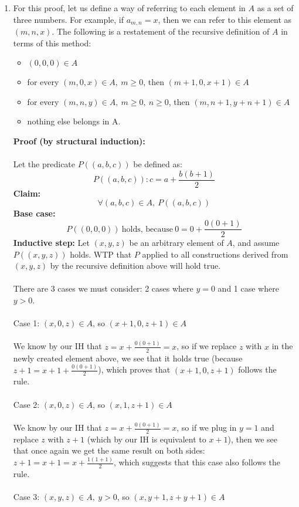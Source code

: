 \documentclass{article}
\begin{document}
\begin{enumerate}
	\item For this proof, let us define a way of referring to each element in $A$ as a set of three numbers. For example, if $a_{m,n}=x$, then we can refer to this element as $(m,n,x)$. The following is a restatement of the recursive definition of $A$ in terms of this method: 
	\begin{itemize}
		\item $(0,0,0) \in A$
		\item for every $(m,0,x) \in A,\ m \geq 0$, then $(m+1,0,x+1) \in A$
		\item for every $(m,n,y) \in A,\ m \geq 0,\ n \geq 0$, then $(m,n+1,y+n+1) \in A$
		\item nothing else belongs in A.
	\end{itemize}
	\textbf{Proof (by structural induction):} \\\\
	Let the predicate $P((a,b,c))$ be defined as: $$P((a,b,c)): c = a+\frac{b(b+1)}{2}$$
	\textbf{Claim:} $$\forall (a,b,c) \in A,\ P((a,b,c))$$
	\textbf{Base case:} $$P((0,0,0))\ \textrm{holds, because}\ 0 = 0 + \frac{0(0+1)}{2}$$
	\textbf{Inductive step:} Let $(x,y,z)$ be an arbitrary element of $A$, and assume $P((x,y,z))$ holds. WTP that $P$ applied to all constructions derived from $(x,y,z)$ by the recursive definition above will hold true. \\\\
	There are 3 cases we must consider: 2 cases where $y=0$ and 1 case where $y>0$. \\\\
	Case 1: $(x,0,z) \in A$, so $(x+1,0,z+1) \in A$ \\\\
	We know by our IH that $z=x+\frac{0(0+1)}{2}=x$, so if we replace $z$ with $x$ in the newly created element above, we see that it holds true (because $z+1=x+1+\frac{0(0+1)}{2}$), which proves that $(x+1,0,z+1)$ follows the rule. \\\\
	Case 2: $(x,0,z) \in A$, so $(x,1,z+1) \in A$ \\\\
	We know by our IH that $z=x+\frac{0(0+1)}{2}=x$, so if we plug in $y=1$ and replace $z$ with $z+1$ (which by our IH is equivalent to $x+1$), then we see that once again we get the same result on both sides: $z+1=x+1=x+\frac{1(1+1)}{2}$, which suggests that this case also follows the rule. \\\\
	Case 3: $(x,y,z) \in A,\ y>0$, so $(x,y+1,z+y+1) \in A$ \\\\

\end{enumerate}
\end{document}
